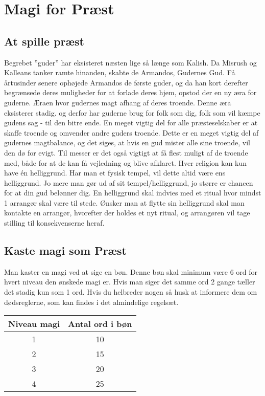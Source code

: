 \chapter{Magi for Præst}



\section{At spille præst}
Begrebet ”guder” har eksisteret næsten lige så længe som Kalish. Da Misrush og Kalleans tanker ramte hinanden, skabte de Armandos, Gudernes Gud. Få årtusinder senere ophøjede Armandos de første guder, og da han kort derefter begrænsede deres muligheder for at forlade deres hjem, opstod der en ny æra for guderne. Æraen hvor gudernes magt afhang af deres troende. Denne æra eksisterer stadig. og derfor har guderne brug for folk som dig, folk som vil kæmpe gudens sag - til den bitre ende. En meget vigtig del for alle præsteselskaber er at skaffe troende og omvender andre guders troende. Dette er en meget vigtig del af gudernes magtbalance, og det siges, at hvis en gud mister alle sine troende, vil den dø for evigt. Til messer er det også vigtigt at få flest muligt af de troende med, både for at de kan få vejledning og blive afklaret. Hver religion kan kun have én helliggrund. Har man et fysisk tempel, vil dette altid være ens helliggrund. Jo mere man gør ud af sit tempel/helliggrund, jo større er chancen for at din gud belønner dig. En helliggrund skal indvies med et ritual hvor mindst 1 arrangør skal være til stede. Ønsker man at flytte sin helliggrund skal man kontakte en arrangør, hvorefter der holdes et nyt ritual, og arrangøren vil tage stilling til konsekvenserne heraf.

\section{Kaste magi som Præst}
Man kaster en magi ved at sige en bøn. Denne bøn skal minimum være 6 ord for hvert niveau den ønskede magi er. Hvis man siger det samme ord 2 gange tæller det stadig kun som 1 ord. Hvis du helbreder nogen så husk at informere dem om dødsreglerne, som kan findes i det almindelige regelsæt.\\
\begin{table}[H]
    \centering
    \begin{tabular}{c|c}
        Niveau magi & Antal ord i bøn \\\hline
        1 & 10\\
        2 & 15\\
        3 & 20\\
        4 & 25\\
    \end{tabular}
\end{table}

